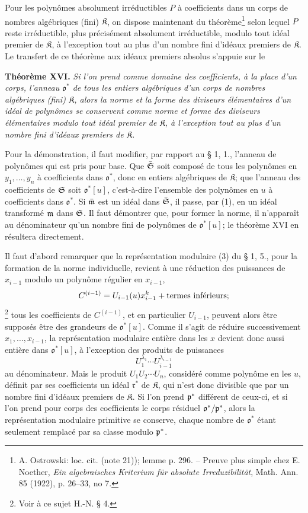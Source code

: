 Pour les polynômes absolument irréductibles $P$ à coefficients dans un corps de nombres algébriques (fini) $\mathfrak K$, on dispose maintenant du théorème\footnote{A. Ostrowski: loc. cit. (note 21)); lemme p. 296. -- Preuve plus simple chez E. Noether, \emph{Ein algebraisches Kriterium für absolute Irreduzibilität}, Math. Ann. 85 (1922), p. 26--33, no 7.} selon lequel $P$ reste irréductible, plus précisément absolument irréductible, modulo tout idéal premier de $\mathfrak K$, à l'exception tout au plus d'un nombre fini d'idéaux premiers de $\mathfrak K$. Le transfert de ce théorème aux idéaux premiers absolus s'appuie sur le

\textbf{Théorème XVI.} \emph{Si l'on prend comme domaine des coefficients, à la place d'un corps, l'anneau $\mathfrak o^*$ de tous les entiers algébriques d'un corps de nombres algébriques (fini) $\mathfrak K$, alors la norme et la forme des diviseurs élémentaires d'un idéal de polynômes se conservent comme norme et forme des diviseurs élémentaires modulo tout idéal premier de $\mathfrak K$, à l'exception tout au plus d'un nombre fini d'idéaux premiers de $\mathfrak K$.}

Pour la démonstration, il faut modifier, par rapport au \S{} 1, 1., l'anneau de polynômes qui est pris pour base. Que $\bar{\mathfrak S}$ soit composé de tous les polynômes en $y_1,\ldots,y_n$ à coefficients dans $\mathfrak o^*$, donc en entiers algébriques de $\mathfrak K$; que l'anneau des coefficients de $\mathfrak S$ soit $\mathfrak o^*[u]$, c'est-à-dire l'ensemble des polynômes en $u$ à coefficients dans $\mathfrak o^*$. Si $\bar{\mathfrak m}$ est un idéal dans $\bar{\mathfrak S}$, il passe, par (1), en un idéal transformé $\mathfrak m$ dans $\mathfrak S$. Il faut démontrer que, pour former la norme, il n'apparaît au dénominateur qu'un nombre fini de polynômes de $\mathfrak o^*[u]$; le théorème XVI en résultera directement.

Il faut d'abord remarquer que la représentation modulaire (3) du \S{} 1, 5., pour la formation de la norme individuelle, revient à une réduction des puissances de $x_{i-1}$ modulo un polynôme régulier en $x_{i-1}$,
\[
 C^{(i-1)}=U_{i-1}(u)x_{i-1}^{k}+\hbox{termes inférieurs};
\]
\footnote{Voir à ce sujet H.-N. \S{} 4.} tous les coefficients de $C^{(i-1)}$, et en particulier $U_{i-1}$, peuvent alors être supposés être des grandeurs de $\mathfrak o^*[u]$. Comme il s'agit de réduire successivement $x_1,\ldots,x_{i-1}$, la représentation modulaire entière dans les $x$ devient donc aussi entière dans $\mathfrak o^*[u]$, à l'exception des produits de puissances
\[
 U_1^{\lambda_1}\cdots U_{i-1}^{\lambda_{i-1}}
\]
au dénominateur. Mais le produit $U_1U_2\cdots U_n$, considéré comme polynôme en les $u$, définit par ses coefficients un idéal $\mathfrak r^*$ de $\mathfrak K$, qui n'est donc divisible que par un nombre fini d'idéaux premiers de $\mathfrak K$. Si l'on prend $\mathfrak p^*$ différent de ceux-ci, et si l'on prend pour corps des coefficients le corps résiduel $\mathfrak o^*/\mathfrak p^*$, alors la représentation modulaire primitive se conserve, chaque nombre de $\mathfrak o^*$ étant seulement remplacé par sa classe modulo $\mathfrak p^*$.


